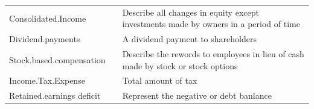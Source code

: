\documentclass[11pt,]{article}
\begin{document}
\begin{longtable}[]{@{}lll@{}}
\begin{minipage}[t]{0.19\columnwidth}
Consolidated.Income\strut
\end{minipage} & \begin{minipage}[t]{0.10\columnwidth}\raggedright
\strut
\end{minipage} & \begin{minipage}[t]{0.62\columnwidth}\raggedright
Describe all changes in equity except investments made by owners in a
period of time\strut
\end{minipage}\tabularnewline
\begin{minipage}[t]{0.19\columnwidth}\raggedright
Dividend.payments\strut
\end{minipage} & \begin{minipage}[t]{0.10\columnwidth}\raggedright
\strut
\end{minipage} & \begin{minipage}[t]{0.62\columnwidth}\raggedright
A dividend payment to shareholders\strut
\end{minipage}\tabularnewline
\begin{minipage}[t]{0.19\columnwidth}\raggedright
Stock.based.compensation\strut
\end{minipage} & \begin{minipage}[t]{0.10\columnwidth}\raggedright
\strut
\end{minipage} & \begin{minipage}[t]{0.62\columnwidth}\raggedright
Describe the rewords to employees in lieu of cash made by stock or stock
options\strut
\end{minipage}\tabularnewline
\begin{minipage}[t]{0.19\columnwidth}\raggedright
Income.Tax.Expense\strut
\end{minipage} & \begin{minipage}[t]{0.10\columnwidth}\raggedright
\strut
\end{minipage} & \begin{minipage}[t]{0.62\columnwidth}\raggedright
Total amount of tax\strut
\end{minipage}\tabularnewline
\begin{minipage}[t]{0.19\columnwidth}\raggedright
Retained.earnings deficit\strut
\end{minipage} & \begin{minipage}[t]{0.10\columnwidth}\raggedright
\strut
\end{minipage} & \begin{minipage}[t]{0.62\columnwidth}\raggedright
Represent the negative or debt banlance\strut
\end{minipage}\tabularnewline

\end{longtable}
\end{document}

